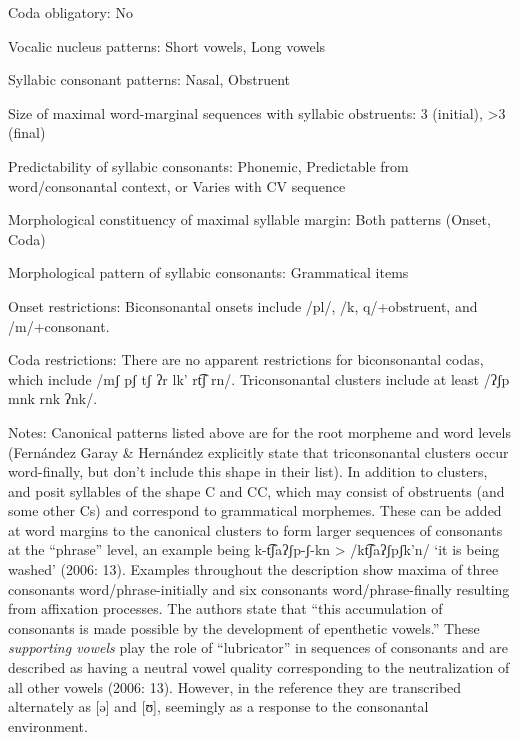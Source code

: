 {\begin{appendixdesc}
\item[Coda obligatory:] No

\item[Vocalic nucleus patterns:] Short vowels, Long vowels

\item[Syllabic consonant patterns:] Nasal, Obstruent

\item[Size of maximal word-marginal sequences with syllabic obstruents:] 3 (initial), >3 (final)

\item[Predictability of syllabic consonants:] Phonemic, Predictable from word/consonantal context, or Varies with CV sequence

\item[Morphological constituency of maximal syllable margin:] Both patterns (Onset, Coda)

\item[Morphological pattern of syllabic consonants:] Grammatical items

\item[Onset restrictions:] Biconsonantal onsets include /pl/, /k, q/+obstruent, and /m/+consonant.

\item[Coda restrictions:] There are no apparent restrictions for biconsonantal codas, which include /mʃ pʃ tʃ ʔr lk' rt͡ʃ rn/. Triconsonantal clusters include at least /ʔʃp mnk rnk ʔnk/.

\item[Notes:] Canonical patterns listed above are for the root morpheme and word levels (Fernández Garay \& Hernández explicitly state that triconsonantal clusters occur word-finally, but don’t include this shape in their list). In addition to clusters,  \citet{FernándezGaray1998} and  \citet{FernándezGarayHernández2006} posit syllables of the shape C and CC, which may consist of obstruents (and some other Cs) and correspond to grammatical morphemes. These can be added at word margins to the canonical clusters to form larger sequences of consonants at the “phrase” level, an example being k{}-t͡ʃaʔʃp{}-ʃ{}-kn > /kt͡ʃaʔʃpʃk’n/ ‘it is being washed’ (2006: 13). Examples throughout the description show maxima of three consonants word/phrase-initially and six consonants word/phrase-finally resulting from affixation processes. The authors state that “this accumulation of consonants is made possible by the development of epenthetic vowels.” These \textit{supporting vowels} play the role of “lubricator” in sequences of consonants and are described as having a neutral vowel quality corresponding to the neutralization of all other vowels (2006: 13). However, in the \citeyear{FernándezGaray1998} reference they are transcribed alternately as [ə] and [ʊ], seemingly as a response to the consonantal environment.
\end{appendixdesc}
}
